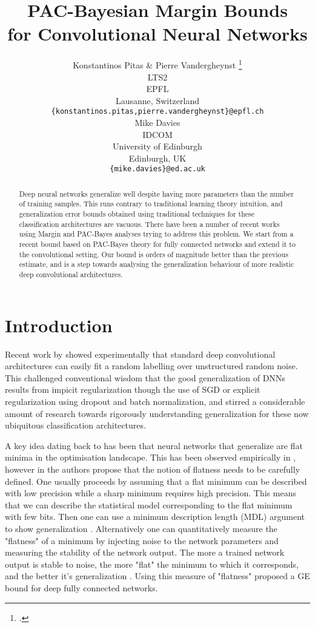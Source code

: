 \documentclass{article} %
\title{PAC-Bayesian Margin Bounds \\ for Convolutional Neural Networks}
\author{Konstantinos Pitas \& Pierre Vandergheynst \thanks{.} \\
LTS2\\
EPFL\\
Lausanne, Switzerland \\
\texttt{\{konstantinos.pitas,pierre.vandergheynst\}@epfl.ch} \\
\And
Mike Davies \\
IDCOM \\
University of Edinburgh \\
Edinburgh, UK \\
\texttt{\{mike.davies\}@ed.ac.uk} \\
}
\theoremstyle{definition}
\begin{document}
\maketitle

\begin{abstract}
Deep neural networks generalize well despite having more parameters than the number of training samples. This runs contrary to traditional learning theory intuition, and generalization error bounds obtained using traditional techniques for these classification architectures are vacuous. There have been a number of recent works using Margin and PAC-Bayes analyses trying to address this problem. We start from a recent bound based on PAC-Bayes theory for fully connected networks and extend it to the convolutional setting. Our bound is orders of magnitude better than the previous estimate, and is a step towards analysing the generalization behaviour of more realistic deep convolutional architectures. 
\end{abstract}

\section{Introduction}
Recent work by \citet{zhang2016understanding} showed experimentally that standard deep convolutional architectures can easily fit a random labelling over unstructured random noise. This challenged conventional wisdom that the good generalization of DNNs results from impicit regularization though the use of SGD or explicit regularization using dropout and batch normalization, and stirred a considerable amount of research towards rigorously understanding generalization for these now ubiquitous classification architectures.

A key idea dating back to \citet{hochreiter1997flat} has been that neural networks that generalize are flat minima in the optimisation landscape. This has been observed empirically in \citet{keskar2016large}, however in \citet{dinh2017sharp} the authors propose that the notion of flatness needs to be carefully defined. One usually proceeds by assuming that a flat minimum can be described with low precision while a sharp minimum requires high precision. This means that we can describe the statistical model corresponding to the flat minimum with few bits. Then one can use a minimum description length (MDL) argument to show generalization \citet{rissanen1983universal}. Alternatively one can quantitatively measure the "flatness" of a minimum by injecting noise to the network parameters and measuring the stability of the network output. The more a trained network output is stable to noise, the more "flat" the minimum to which it corresponds, and the better it's generalization \citet{shawe1997pac} \citet{mcallester1999some}. Using this measure of "flatness" \citet{neyshabur2017pac} proposed a GE bound for deep fully connected networks. 
\end{document}
